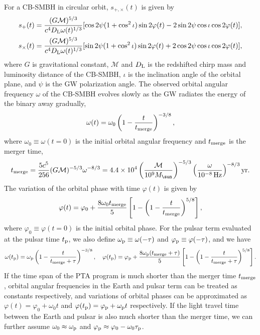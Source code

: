 \documentclass[times,tight]{aastex631}
\begin{document}
For a CB-SMBH in circular orbit, $s_{+,\times}(t)$ is given by
\begin{align}
    s_{+}(t) &= \frac{(G\mathcal{M})^{5/3}}{c^4D_{\rm L}\omega(t)^{1/3}} [\cos2\psi(1+\cos^2\iota)\sin2\varphi(t) - 2\sin2\psi \cos\iota \cos 2\varphi(t)], \nonumber \\
    s_{\times}(t) &= \frac{(G\mathcal{M})^{5/3}}{c^4D_{\rm L}\omega(t)^{1/3}} [\sin2\psi(1+\cos^2\iota)\sin2\varphi(t) + 2\cos2\psi \cos\iota \cos 2\varphi(t)],
\end{align}
where $G$ is gravitational constant, $\mathcal{M}$ and $D_{\rm L}$ is the redshifted chirp mass and luminosity distance of the CB-SMBH, $\iota$ is the inclination angle of the orbital plane, and $\psi$ is the GW polarization angle.
The observed orbital angular frequency $\omega$ of the CB-SMBH evolves slowly as the GW radiates the energy of the binary away gradually,
\begin{equation}\label{eq:orbital_angular_frequency}
    \omega(t) = \omega_0 \left(1 - \frac{t}{t_{\rm merge}}\right)^{-3/8},
\end{equation}
where $\omega_0 \equiv \omega(t = 0)$ is the initial orbital angular frequency and $t_{\rm merge}$ is the merger time,
\begin{equation}
    t_{\rm merge} = \frac{5c^5}{256} (G\mathcal{M})^{-5/3} \omega^{-8/3} = \num{4.4e4} \left(\frac{\mathcal{M}}{\num{e9}M_{\sun}}\right)^{-5/3} \left(\frac{\mathcal{\omega}}{\SI{e-8}{\hertz}}\right)^{-8/3} \si{yr}.
\end{equation}
The variation of the orbital phase with time $\varphi(t)$ is given by
\begin{equation}\label{eq:orbital_phase}
    \varphi(t) = \varphi_0 + \frac{8\omega_0 t_{\rm merge}}{5} \left[1-\left(1-\frac{t}{t_{\rm merge}}\right)^{5/8}\right],
\end{equation}
where $\varphi_0 \equiv \varphi(t = 0)$ is the initial orbital phase.
For the pulsar term evaluated at the pulsar time $t_{\rm p}$, we also define $\omega_{\rm p} \equiv \omega(-\tau)$ and $\varphi_{\rm p} \equiv \varphi(-\tau)$, and we have
\begin{equation}
    \omega(t_{\rm p}) = \omega_{\rm p} \left(1 - \frac{t}{t_{\rm merge} + \tau}\right)^{-3/8} \qc
    \varphi(t_{\rm p}) = \varphi_{\rm p} + \frac{8\omega_{\rm p}(t_{\rm merge} + \tau)}{5} \left[1-\left(1-\frac{t}{t_{\rm merge}+\tau}\right)^{5/8}\right].
\end{equation}
If the time span of the PTA program is much shorter than the merger time $t_{\rm merge}$, orbital angular frequencies in the Earth and pulsar term can be treated as constants respectively, and variations of orbital phases can be approximated as
$\varphi(t) = \varphi_0 + \omega_0 t$ and $\varphi(t_{\rm p}) = \varphi_{\rm p} + \omega_{\rm p} t$ respectively.
If the light travel time between the Earth and pulsar is also much shorter than the merger time, we can further assume $\omega_0 \approx \omega_{\rm p}$ and $\varphi_{\rm p} \approx \varphi_0 - \omega_{0}\tau_{\rm p}$.
\end{document}

